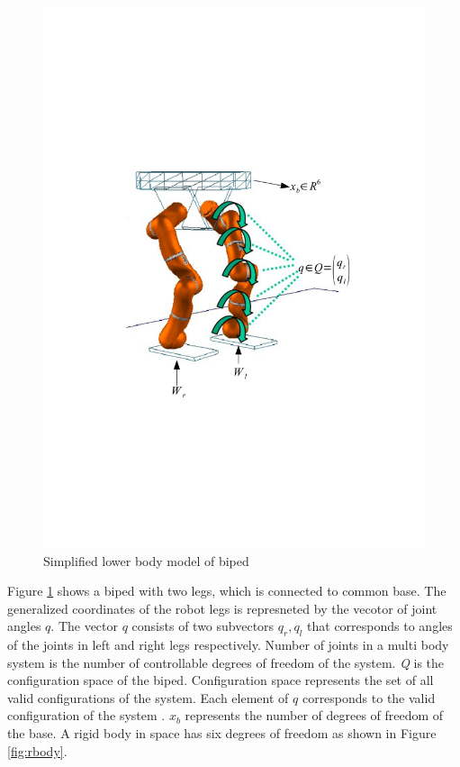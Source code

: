 
\begin{figure}
\begin{center}
\includegraphics[trim= 10mm 80mm 10mm 80mm,scale=0.75]{Bilder/model_biped.pdf}
\caption{Simplified lower body model of biped}
\label{fig:biped_simplelow}
\end{center}
\end{figure}
Figure \ref{fig:biped_simplelow} shows a biped with two legs, which is connected to common base. The generalized coordinates of the robot legs is represneted by the vecotor of joint angles $q$. The vector $q$ consists of two subvectors $q_r,q_l$ that corresponds to angles of the joints in left and right legs respectively. Number of joints in a multi body system is the number of controllable degrees of freedom of the system. \emph{Q} is the configuration space of the biped. Configuration space represents the set of all valid configurations of the system. Each element of $q$ corresponds to the valid configuration of the system \cite[Chapter 2]{mur94}. $x_b$ represents the number of degrees of freedom of the base. A rigid body in space has six degrees of freedom as shown in Figure \ref{fig:rbody}.
